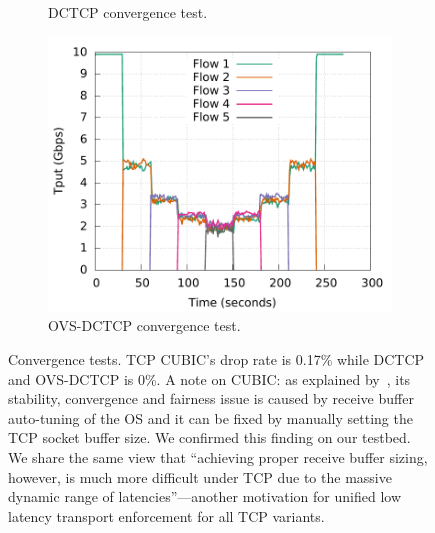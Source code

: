 \begin{figure}[t]
\begin{subfigure}[b]{0.33\textwidth}
		\caption{DCTCP convergence test.}
        	\label{dctcp_convergence}
	\end{subfigure}
	\begin{subfigure}[b]{0.33\textwidth}
                \centering
		\includegraphics[width=\textwidth]{figures/convergence/flowcontrolOFF/ovsdctcp_flowcontrolOFF_convergence.pdf}
		\caption{OVS-DCTCP convergence test.}
        	\label{ovsdctcp_convergence}
	\end{subfigure}
	\caption{Convergence tests. TCP CUBIC's drop rate is 0.17\% while DCTCP and OVS-DCTCP is 0\%.
		A note on CUBIC: as explained by~\cite{judd2015nsdi}, its stability, convergence and fairness issue
		is caused by receive buffer auto-tuning of the OS and it can be fixed by manually 
		setting the TCP socket buffer size. We confirmed this finding on our testbed. 
		We share the same view that ``achieving proper receive buffer sizing, however, 
		is much more difficult under TCP due to the massive dynamic range of latencies''---another 
		motivation for unified low latency transport enforcement for all TCP variants.
		}
	\label{convergence_test}
\end{figure}

